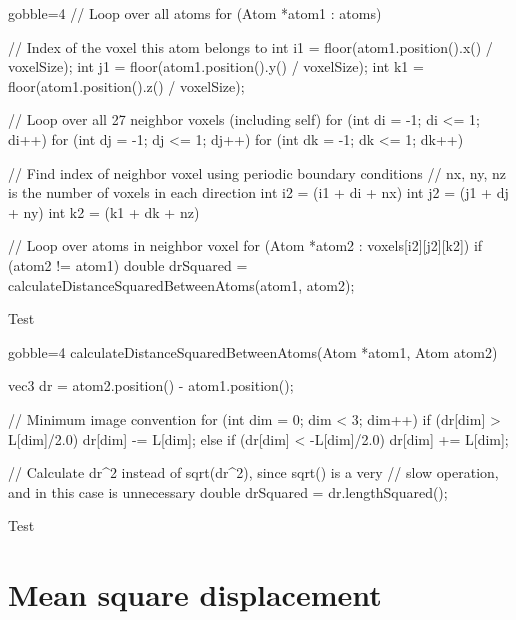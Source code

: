 \begin{listing}[H]
\begin{cppcode*}{gobble=4}
    // Loop over all atoms
    for (Atom *atom1 : atoms)
    {
        // Index of the voxel this atom belongs to
        int i1 = floor(atom1.position().x() / voxelSize);
        int j1 = floor(atom1.position().y() / voxelSize);
        int k1 = floor(atom1.position().z() / voxelSize);
        
        // Loop over all 27 neighbor voxels (including self)
        for (int di = -1; di <= 1; di++)
        for (int dj = -1; dj <= 1; dj++)
        for (int dk = -1; dk <= 1; dk++)
        {{{
            // Find index of neighbor voxel using periodic boundary conditions
            // nx, ny, nz is the number of voxels in each direction
            int i2 = (i1 + di + nx) %
            int j2 = (j1 + dj + ny) %
            int k2 = (k1 + dk + nz) %
            
            // Loop over atoms in neighbor voxel
            for (Atom *atom2 : voxels[i2][j2][k2])
            {
                if (atom2 != atom1)
                {
                    double drSquared = 
                        calculateDistanceSquaredBetweenAtoms(atom1, atom2);
                }
            }
        }}}
    }
    
\end{cppcode*}
\caption{Test
    \label{list:neighbors}
}
\end{listing}

\begin{listing}[H]
\begin{cppcode*}{gobble=4}
    calculateDistanceSquaredBetweenAtoms(Atom *atom1, Atom atom2)
    {
        vec3 dr = atom2.position() - atom1.position();
        
        // Minimum image convention
        for (int dim = 0; dim < 3; dim++)
        {
            if      (dr[dim] >  L[dim]/2.0) dr[dim] -= L[dim];
            else if (dr[dim] < -L[dim]/2.0) dr[dim] += L[dim];
        }
        
        // Calculate dr^2 instead of sqrt(dr^2), since sqrt() is a very 
        // slow operation, and in this case is unnecessary
        double drSquared = dr.lengthSquared();
    }
\end{cppcode*}
\caption{Test
    \label{list:dr2}
}
\end{listing}

    \section{Mean square displacement}

